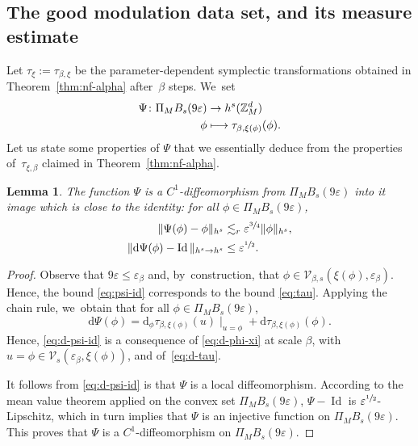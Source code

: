 \documentclass[10pt,a4paper]{amsart}
\newcommand\mto{\mathchoice{\longmapsto}{\mapsto}{\mapsto}{\mapsto}}
\theoremstyle{plain}
\newtheorem{lemma}[theorem]{Lemma}
\theoremstyle{definition}
\DeclareMathOperator{\Id}{Id}
\newcommand{\Z}{\mathbb{Z}}
\newcommand{\1}{\mathbf{1}}
\let\epsilon\varepsilon
\begin{document}
\subsection{The good modulation data set, and its measure estimate}
\label{sec:meas}
Let $\tau_{\xi}:=\tau_{\beta,\xi}$ be the parameter-dependent symplectic transformations obtained in Theorem~\ref{thm:nf-alpha} after~$\beta$ steps. We~set
\begin{equation}
\label{eq:psi}
\begin{aligned}
\Psi \colon \Pi_{M}B_s(9\epsilon) &\to  h^s(\Z_{M}^{d}) \\
\phi& \mto \tau_{\beta,\xi(\phi)}(\phi).
\end{aligned}
\end{equation}
Let us state some properties of $\Psi$ that we essentially deduce from the properties of~$\tau_{\xi,\beta}$ claimed in Theorem~\ref{thm:nf-alpha}.
\begin{lemma}
\label{lem:psi-lip}
The function $\Psi$ is a $C^{1}$-diffeomorphism from $\Pi_{M}B_{s}(9\epsilon)$ into it image which is close to the identity: for all $\phi\in \Pi_{M}B_{s}(9\epsilon)$,
\begin{align}
\label{eq:psi-id}
\|\Psi(\phi)-\phi\|_{h^{s}}
&\lesssim_{r}\epsilon^{\sfrac{3}{4}}\|\phi\|_{h^{s}},\\
\label{eq:d-psi-id}
\|\mathrm{d} \Psi(\phi) -\Id\|_{h^s\to h^s}
&\leq \epsilon^{\sfrac{1}{2}}.
\end{align}
\end{lemma}
\begin{proof}
Observe that $9\epsilon\leq \epsilon_{\beta}$ and, by~construction, that $\phi\in\mathcal{V}_{\beta,s}(\xi(\phi),\epsilon_{\beta})$. Hence, the bound \eqref{eq:psi-id} corresponds to the bound \eqref{eq:tau}. Applying the chain rule, we~obtain that for all $\phi\in \Pi_{M}B_{s}(9\epsilon)$,
\[
\mathrm{d}\Psi(\phi) = \mathrm{d}_{\phi}\tau_{\beta,\xi(\phi)}(u)\mid_{u=\phi}+\mathrm{d}\tau_{\beta,\xi(\phi)}(\phi).
\]
Hence, \eqref{eq:d-psi-id} is a consequence of \eqref{eq:d-phi-xi} at scale $\beta$, with $u=\phi\in\mathcal{V}_{s}(\epsilon_{\beta},\xi(\phi))$, and of~\eqref{eq:d-tau}.

It follows from \eqref{eq:d-psi-id} is that $\Psi$ is a local diffeomorphism. According to the mean value theorem applied on the convex set $\Pi_{M}B_{s}(9\epsilon)$,
$\Psi-\Id$ is $\epsilon^{\sfrac{1}{2}}$-Lipschitz, which in turn implies that $\Psi$ is an injective function on $\Pi_{M}B_{s}(9\epsilon)$. This proves that $\Psi$ is a $C^{1}$-diffeomorphism on $\Pi_{M}B_{s}(9\epsilon)$.
\end{proof}
\end{document}
